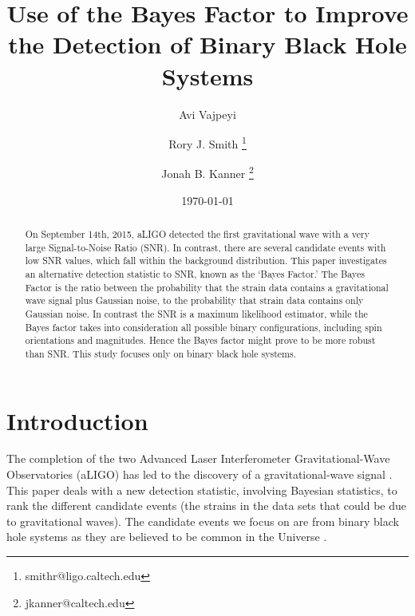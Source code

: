 \documentclass{article}
\title{Use of the Bayes Factor to Improve the Detection of Binary Black Hole Systems} %
\author[1]{Avi Vajpeyi }
\author[2]{Rory J. Smith \thanks{smith\textunderscore r@ligo.caltech.edu}}
\author[2]{Jonah B. Kanner \thanks{jkanner@caltech.edu}}
\affil[1]{The College of Wooster, Wooster, OH 44691, USA}
\affil[2]{LIGO Laboratory, California Institute of Technology, Pasadena, CA 91125, USA}
\date{\today} %
\begin{document}
\maketitle %






 \begin{abstract}

On September 14th, 2015, aLIGO detected the first gravitational wave with a very large Signal-to-Noise Ratio (SNR). In contrast, there are several candidate events with low SNR values, which fall within the background distribution. This paper investigates an alternative detection statistic to SNR, known as the ‘Bayes Factor.'  The Bayes Factor is the ratio between the probability that the strain data contains a gravitational wave signal plus Gaussian noise, to the probability that strain data contains only Gaussian noise. In contrast the SNR is a maximum likelihood estimator, while the Bayes factor takes into consideration all possible binary configurations, including spin orientations and magnitudes. Hence the Bayes factor might prove to be more robust than SNR. This study focuses only on binary black hole systems.



\end{abstract}  




\newpage
\section{Introduction}

\indent The completion of the two Advanced Laser Interferometer Gravitational-Wave Observatories (aLIGO) has led to the discovery of a gravitational-wave signal \cite{DetectionPaper}. This paper deals with a new detection statistic, involving Bayesian statistics, to rank the different candidate events (the strains in the data sets that could be due to gravitational waves). The candidate events we focus on are from binary black hole systems as they are believed to be common in the Universe \cite{NumDetections}.\\
\end{document}
